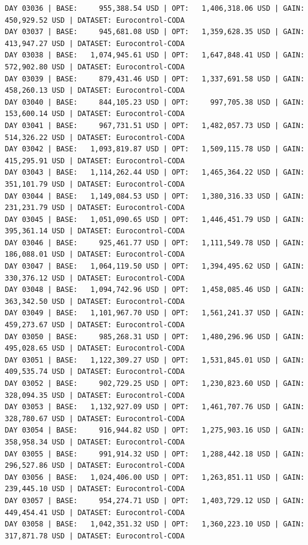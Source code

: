 \documentclass[11pt,a4paper]{article}
\begin{document}
\begin{verbatim}
DAY 03036 | BASE:     955,388.54 USD | OPT:   1,406,318.06 USD | GAIN: 450,929.52 USD | DATASET: Eurocontrol-CODA
DAY 03037 | BASE:     945,681.08 USD | OPT:   1,359,628.35 USD | GAIN: 413,947.27 USD | DATASET: Eurocontrol-CODA
DAY 03038 | BASE:   1,074,945.61 USD | OPT:   1,647,848.41 USD | GAIN: 572,902.80 USD | DATASET: Eurocontrol-CODA
DAY 03039 | BASE:     879,431.46 USD | OPT:   1,337,691.58 USD | GAIN: 458,260.13 USD | DATASET: Eurocontrol-CODA
DAY 03040 | BASE:     844,105.23 USD | OPT:     997,705.38 USD | GAIN: 153,600.14 USD | DATASET: Eurocontrol-CODA
DAY 03041 | BASE:     967,731.51 USD | OPT:   1,482,057.73 USD | GAIN: 514,326.22 USD | DATASET: Eurocontrol-CODA
DAY 03042 | BASE:   1,093,819.87 USD | OPT:   1,509,115.78 USD | GAIN: 415,295.91 USD | DATASET: Eurocontrol-CODA
DAY 03043 | BASE:   1,114,262.44 USD | OPT:   1,465,364.22 USD | GAIN: 351,101.79 USD | DATASET: Eurocontrol-CODA
DAY 03044 | BASE:   1,149,084.53 USD | OPT:   1,380,316.33 USD | GAIN: 231,231.79 USD | DATASET: Eurocontrol-CODA
DAY 03045 | BASE:   1,051,090.65 USD | OPT:   1,446,451.79 USD | GAIN: 395,361.14 USD | DATASET: Eurocontrol-CODA
DAY 03046 | BASE:     925,461.77 USD | OPT:   1,111,549.78 USD | GAIN: 186,088.01 USD | DATASET: Eurocontrol-CODA
DAY 03047 | BASE:   1,064,119.50 USD | OPT:   1,394,495.62 USD | GAIN: 330,376.12 USD | DATASET: Eurocontrol-CODA
DAY 03048 | BASE:   1,094,742.96 USD | OPT:   1,458,085.46 USD | GAIN: 363,342.50 USD | DATASET: Eurocontrol-CODA
DAY 03049 | BASE:   1,101,967.70 USD | OPT:   1,561,241.37 USD | GAIN: 459,273.67 USD | DATASET: Eurocontrol-CODA
DAY 03050 | BASE:     985,268.31 USD | OPT:   1,480,296.96 USD | GAIN: 495,028.65 USD | DATASET: Eurocontrol-CODA
DAY 03051 | BASE:   1,122,309.27 USD | OPT:   1,531,845.01 USD | GAIN: 409,535.74 USD | DATASET: Eurocontrol-CODA
DAY 03052 | BASE:     902,729.25 USD | OPT:   1,230,823.60 USD | GAIN: 328,094.35 USD | DATASET: Eurocontrol-CODA
DAY 03053 | BASE:   1,132,927.09 USD | OPT:   1,461,707.76 USD | GAIN: 328,780.67 USD | DATASET: Eurocontrol-CODA
DAY 03054 | BASE:     916,944.82 USD | OPT:   1,275,903.16 USD | GAIN: 358,958.34 USD | DATASET: Eurocontrol-CODA
DAY 03055 | BASE:     991,914.32 USD | OPT:   1,288,442.18 USD | GAIN: 296,527.86 USD | DATASET: Eurocontrol-CODA
DAY 03056 | BASE:   1,024,406.00 USD | OPT:   1,263,851.11 USD | GAIN: 239,445.10 USD | DATASET: Eurocontrol-CODA
DAY 03057 | BASE:     954,274.71 USD | OPT:   1,403,729.12 USD | GAIN: 449,454.41 USD | DATASET: Eurocontrol-CODA
DAY 03058 | BASE:   1,042,351.32 USD | OPT:   1,360,223.10 USD | GAIN: 317,871.78 USD | DATASET: Eurocontrol-CODA

\end{verbatim}
\end{document}
